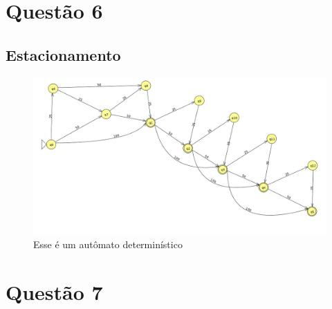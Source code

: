 \documentclass[11pt]{article}
\begin{document}
\section{Questão 6}
\label{sec:org07374bf}
\subsection{Estacionamento}
\label{sec:org401c7e7}
\begin{figure}[htbp]
\centering
\includegraphics[width=.9\linewidth]{./q6/estacionamento.jpg}
\caption{\label{fig:org7088700}
Esse é um autômato determinístico}
\end{figure}
\section{Questão 7}
\label{sec:orgf1170cb}
\end{document}
